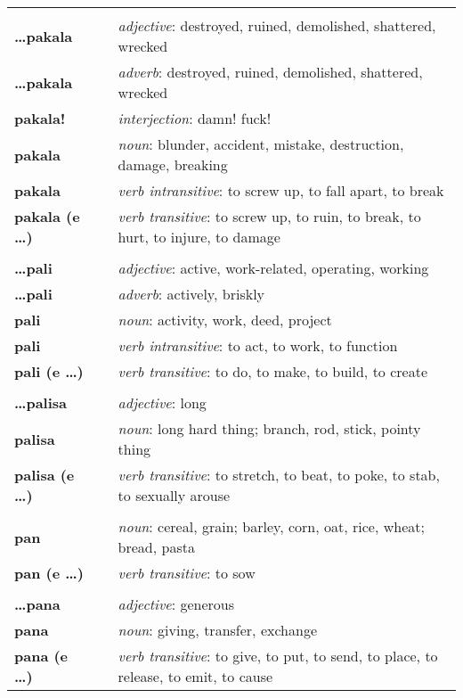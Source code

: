 \begin{supertabular}{p{2,5cm}|ll}
 && \\ %
\textbf{\dots pakala} && \textit{adjective}: destroyed, ruined, demolished, shattered, wrecked \\ 
\textbf{\dots pakala} && \textit{adverb}: destroyed, ruined, demolished, shattered, wrecked \\ 
\textbf{pakala!} && \textit{interjection}: damn! fuck! \\ 
\textbf{pakala} && \textit{noun}: blunder, accident, mistake, destruction, damage, breaking \\ 
\textbf{pakala} && \textit{verb intransitive}: to screw up, to fall apart, to break \\ 
\textbf{pakala (e \dots)} && \textit{verb transitive}: to screw up, to ruin, to break, to hurt, to injure, to damage \\ 
 && \\ %
\textbf{\dots pali} && \textit{adjective}: active, work-related, operating, working \\ 
\textbf{\dots pali} && \textit{adverb}: actively, briskly \\ 
\textbf{pali} && \textit{noun}: activity, work, deed, project \\ 
\textbf{pali} && \textit{verb intransitive}: to act, to work, to function \\ 
\textbf{pali (e \dots)} && \textit{verb transitive}: to do, to make, to build, to create \\ 
 && \\ %
\textbf{\dots palisa} && \textit{adjective}: long \\ 
\textbf{palisa} && \textit{noun}: long hard thing; branch, rod, stick, pointy thing \\ 
\textbf{palisa (e \dots)} && \textit{verb transitive}: to stretch, to beat, to poke, to stab, to sexually arouse \\ 
 && \\ %
\textbf{pan} && \textit{noun}: cereal, grain; barley, corn, oat, rice, wheat; bread, pasta \\ 
\textbf{pan (e \dots)} && \textit{verb transitive}: to sow \\
 && \\ %
\textbf{\dots pana} && \textit{adjective}: generous \\ 
\textbf{pana} && \textit{noun}: giving, transfer, exchange \\ 
\textbf{pana (e \dots)} && \textit{verb transitive}: to give, to put, to send, to place, to release, to emit, to cause \\ 

\end{supertabular}
